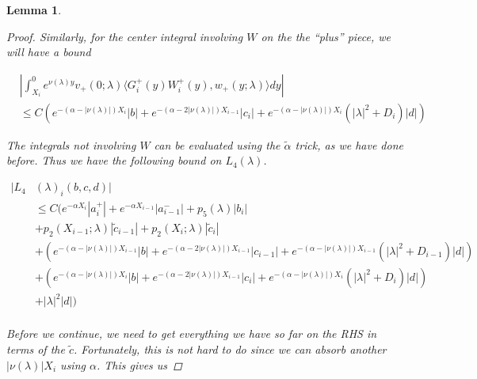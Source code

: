 \documentclass[12pt]{article}
\newtheorem{lemma}{Lemma}
\begin{document}
\begin{lemma}
\begin{proof}
Similarly, for the center integral involving $W$ on the the ``plus'' piece, we will have a bound

\begin{align*}
&\left| \int_{X_i}^0 e^{\nu(\lambda)y} v_+(0; \lambda) \langle G_i^+(y)W_i^+(y), w_+(y; \lambda) \rangle dy \right| \\
&\leq C ( e^{-(\alpha - |\nu(\lambda)|) X_i} |b| + e^{-(\alpha - 2 |\nu(\lambda)|) X_{i-1}}|c_i| + e^{-(\alpha - |\nu(\lambda)|) X_i} (|\lambda|^2 + D_i)|d| )
\end{align*}

The integrals not involving $W$ can be evaluated using the $\tilde{\alpha}$ trick, as we have done before. Thus we have the following bound on $L_4(\lambda)$. 

\begin{align*}
|L_4&(\lambda)_i(b, c, d)|\\ 
&\leq C \Big( e^{-\alpha X_i} |a_i^+| +  e^{-\alpha X_{i-1}} |a_{i-1}^-| + p_5(\lambda) |b_i| \\
&+ p_2(X_{i-1}; \lambda) |\tilde{c}_{i-1}| + p_2(X_i; \lambda) |\tilde{c}_i| \\
&+ ( e^{-(\alpha - |\nu(\lambda)|) X_{i-1}} |b| + e^{-(\alpha - 2 |\nu(\lambda)|) X_{i-1}}|c_{i-1}| + e^{-(\alpha - |\nu(\lambda)|) X_{i-1}} (|\lambda|^2 + D_{i-1})|d| ) \\
&+ ( e^{-(\alpha - |\nu(\lambda)|) X_i} |b| + e^{-(\alpha - 2 |\nu(\lambda)|) X_{i-1}}|c_i| + e^{-(\alpha - |\nu(\lambda)|) X_i} (|\lambda|^2 + D_i)|d| )  \\
&+ |\lambda|^2 |d| \Big)\\
\end{align*}

Before we continue, we need to get everything we have so far on the RHS in terms of the $\tilde{c}$. Fortunately, this is not hard to do since we can absorb another $|\nu(\lambda)|X_i$ using $\alpha$. This gives us


\end{proof}
\end{lemma}
\end{document}

